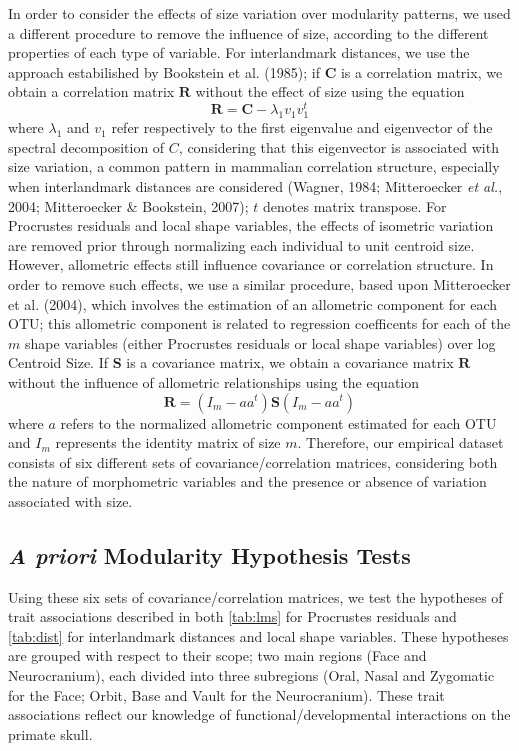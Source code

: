 \documentclass[12pt,]{article}
\begin{document}
In order to consider the effects of size variation over modularity
patterns, we used a different procedure to remove the influence of size,
according to the different properties of each type of variable. For
interlandmark distances, we use the approach estabilished by Bookstein
et al. (1985); if $\mathbf{C}$ is a correlation matrix, we obtain a
correlation matrix $\mathbf{R}$ without the effect of size using the
equation \[
\mathbf{R} = \mathbf{C} - \lambda_1 v_1 v^{t}_1
\] where $\lambda_1$ and $v_1$ refer respectively to the first
eigenvalue and eigenvector of the spectral decomposition of $C$,
considering that this eigenvector is associated with size variation, a
common pattern in mammalian correlation structure, especially when
interlandmark distances are considered (Wagner, 1984; Mitteroecker
\emph{et al.}, 2004; Mitteroecker \& Bookstein, 2007); $t$ denotes
matrix transpose. For Procrustes residuals and local shape variables,
the effects of isometric variation are removed prior through normalizing
each individual to unit centroid size. However, allometric effects still
influence covariance or correlation structure. In order to remove such
effects, we use a similar procedure, based upon Mitteroecker et al.
(2004), which involves the estimation of an allometric component for
each OTU; this allometric component is related to regression coefficents
for each of the $m$ shape variables (either Procrustes residuals or
local shape variables) over log Centroid Size. If $\mathbf{S}$ is a
covariance matrix, we obtain a covariance matrix $\mathbf{R}$ without
the influence of allometric relationships using the equation \[
\mathbf{R} = (I_m - aa^t) \mathbf{S} (I_m - aa^t)
\] where $a$ refers to the normalized allometric component estimated for
each OTU and $I_m$ represents the identity matrix of size $m$.
Therefore, our empirical dataset consists of six different sets of
covariance/correlation matrices, considering both the nature of
morphometric variables and the presence or absence of variation
associated with size.

\subsection{\emph{A priori} Modularity Hypothesis
Tests}\label{a-priori-modularity-hypothesis-tests}

Using these six sets of covariance/correlation matrices, we test the
hypotheses of trait associations described in both \autoref{tab:lms} for
Procrustes residuals and \autoref{tab:dist} for interlandmark distances
and local shape variables. These hypotheses are grouped with respect to
their scope; two main regions (Face and Neurocranium), each divided into
three subregions (Oral, Nasal and Zygomatic for the Face; Orbit, Base
and Vault for the Neurocranium). These trait associations reflect our
knowledge of functional/developmental interactions on the primate skull.
\end{document}

